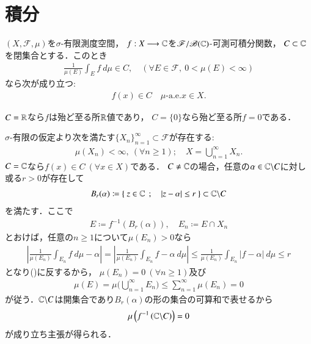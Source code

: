 \section{積分}
	\begin{screen}
		\begin{thm}[積分の平均値と写像の値域の関係]\label{thm:mean_value_of_integral_and_closed_set}
			$(X,\mathscr{F},\mu)$を$\sigma$-有限測度空間，
			$f:X \longrightarrow \mathbb{C}$を$\mathscr{F}/\mathscr{B}(\mathbb{C})$-可測可積分関数，
			$C \subset \mathbb{C}$を閉集合とする．このとき
			\begin{align}
				\frac{1}{\mu(E)}\int_E f\ d\mu \in C,
				\quad (\forall E \in \mathscr{F},\ 0 < \mu(E) < \infty)
				\label{eq:thm_mean_value_of_integral_and_closed_set}
			\end{align}
			なら次が成り立つ:
			\begin{align}
				f(x) \in C \quad \mbox{$\mu$-a.e.}x \in X.
			\end{align}
		\end{thm}
	\end{screen}
	$C=\mathbb{R}$なら$f$は殆ど至る所$\mathbb{R}$値であり，
	$C=\{0\}$なら殆ど至る所$f=0$である．
	\begin{prf}
		$\sigma$-有限の仮定より次を満たす$\{X_n\}_{n=1}^\infty \subset \mathscr{F}$が存在する:
		\begin{align}
			\mu(X_n) < \infty,\ (\forall n \geq 1);
			\quad X = \bigcup_{n=1}^\infty X_n.
		\end{align}
		$C = \mathbb{C}$なら$f(x) \in C\ (\forall x \in X)$である．
		$C \neq \mathbb{C}$の場合，任意の$\alpha \in \mathbb{C} \backslash C$に対し
		或る$r > 0$が存在して
		\begin{align}
			B_r(\alpha) \coloneqq \left\{\ z \in \mathbb{C}\ \, ; \quad |z - \alpha| \leq r\ \right\} \subset \mathbb{C} \backslash C
		\end{align}
		を満たす．ここで
		\begin{align}
			E \coloneqq f^{-1}\left( B_r(\alpha) \right),
			\quad E_n \coloneqq E \cap X_n
		\end{align}
		とおけば，任意の$n \geq 1$について$\mu(E_n) > 0$なら
		\begin{align}
			\left| \frac{1}{\mu(E_n)}\int_{E_n} f\ d\mu - \alpha \right|
			= \left| \frac{1}{\mu(E_n)}\int_{E_n} f - \alpha\ d\mu \right|
			\leq \frac{1}{\mu(E_n)}\int_{E_n} |f - \alpha|\ d\mu
			\leq r
		\end{align}
		となり()に反するから，
		$\mu(E_n) = 0\ (\forall n \geq 1)$及び
		\begin{align}
			\mu(E) = \mu\Biggl( \bigcup_{n=1}^\infty E_n \Biggr) 
			\leq \sum_{n=1}^\infty \mu(E_n) = 0
		\end{align}
		が従う．$\mathbb{C} \backslash C$は開集合であり$B_r(\alpha)$の形の集合の可算和で表せるから
		\begin{align}
			\mu\left( f^{-1}\left( \mathbb{C} \backslash C \right) \right) = 0
		\end{align}
		が成り立ち主張が得られる．
		\QED
	\end{prf}
